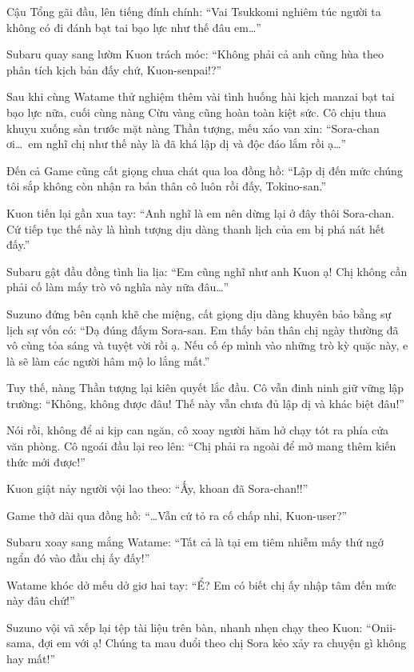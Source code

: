 \documentclass[../main.tex]{subfiles}
\begin{document}
Cậu Tổng gãi đầu, lên tiếng đính chính: ``Vai Tsukkomi nghiêm túc người ta không có đi đánh bạt tai bạo lực như thế đâu em\dots''

Subaru quay sang lườm Kuon trách móc: ``Không phải cả anh cũng hùa theo phân tích kịch bản đấy chứ, Kuon-senpai!?''

\ct

Sau khi cùng Watame thử nghiệm thêm vài tình huống hài kịch manzai bạt tai bạo lực nữa, cuối cùng nàng Cừu vàng cũng hoàn toàn kiệt sức. Cô chịu thua khuỵu xuống sàn trước mặt nàng Thần tượng, mếu xáo van xin: ``Sora-chan ơi\dots\ em nghĩ chị như thế này là đã khá lập dị và độc đáo lắm rồi ạ\dots''


Đến cả Game cũng cất giọng chua chát qua loa đồng hồ: ``Lập dị đến mức chúng tôi sắp không còn nhận ra bản thân cô luôn rồi đấy, Tokino-san.''

Kuon tiến lại gần xua tay: ``Anh nghĩ là em nên dừng lại ở đây thôi Sora-chan. Cứ tiếp tục thế này là hình tượng dịu dàng thanh lịch của em bị phá nát hết đấy.''

Subaru gật đầu đồng tình lia lịa: ``Em cũng nghĩ như anh Kuon ạ! Chị không cần phải cố làm mấy trò vô nghĩa này nữa đâu\dots''

Suzuno đứng bên cạnh khẽ che miệng, cất giọng dịu dàng khuyên bảo bằng sự lịch sự vốn có: ``Dạ đúng đấym Sora-san. Em thấy bản thân chị ngày thường đã vô cùng tỏa sáng và tuyệt vời rồi ạ. Nếu cố ép mình vào những trò kỳ quặc này, e là sẽ làm các người hâm mộ lo lắng mất.''

Tuy thế, nàng Thần tượng lại kiên quyết lắc đầu. Cô vẫn đinh ninh giữ vững lập trường: ``Không, không được đâu! Thế này vẫn chưa đủ lập dị và khác biệt đâu!''

Nói rồi, không để ai kịp can ngăn, cô xoay người hăm hở chạy tót ra phía cửa văn phòng. Cô ngoái đầu lại reo lên: ``Chị phải ra ngoài để mở mang thêm kiến thức mới được!''

Kuon giật nảy người vội lao theo: ``Ấy, khoan đã Sora-chan!!''

Game thở dài qua đồng hồ: ``\dots Vẫn cứ tỏ ra cố chấp nhỉ, Kuon-user?''

Subaru xoay sang mắng Watame: ``Tất cả là tại em tiêm nhiễm mấy thứ ngớ ngẩn đó vào đầu chị ấy đấy!''

Watame khóc dở mếu dở giơ hai tay: ``Ể? Em có biết chị ấy nhập tâm đến mức này đâu chứ!''

Suzuno vội vã xếp lại tệp tài liệu trên bàn, nhanh nhẹn chạy theo Kuon: ``Onii-sama, đợi em với ạ! Chúng ta mau đuổi theo chị Sora kẻo xảy ra chuyện gì không hay mất!''
\end{document}
